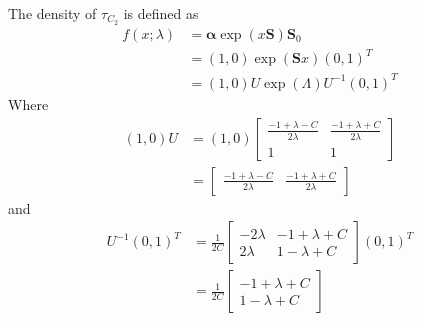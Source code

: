 \documentclass{article}
\theoremstyle{plain}
\theoremstyle{definition}
\theoremstyle{remark}
\numberwithin{equation}{section}
\begin{document}

The density of $\tau_{C_2}$ is defined as
\begin{align*}
 f(x; \lambda) &= \boldsymbol{\alpha} \exp(x \mathbf{S}) \mathbf{S}_0 \nonumber\\
 &= (1, 0) \exp(\mathbf{S} x) (0,1)^T \\
 &= (1, 0) U \exp(\Lambda) U^{-1} (0,1)^T
\end{align*}
Where
\begin{align*}
    (1,0) U &= (1,0) \begin{bmatrix}
    \frac{-1 + \lambda - C}{2\lambda} & \frac{-1 + \lambda + C}{2\lambda}\\
    1 & 1
\end{bmatrix}\\
    &= \begin{bmatrix}
    \frac{-1 + \lambda - C}{2\lambda} & \frac{-1 + \lambda + C}{2\lambda}
    \end{bmatrix}
\end{align*}
and
\begin{align*}
    U^{-1} (0,1)^T &= \frac{1}{2C} \begin{bmatrix}
    -2\lambda & -1 + \lambda + C\\
    2\lambda & 1 - \lambda + C
    \end{bmatrix} (0,1)^T\\
    &= \frac{1}{2C} \begin{bmatrix}
    -1 + \lambda + C\\
    1 - \lambda + C
    \end{bmatrix}
\end{align*}
\end{document}
